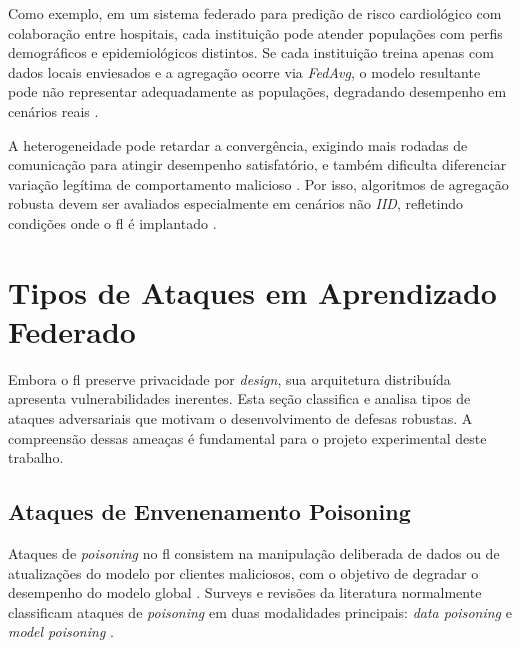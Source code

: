 Como exemplo, em um sistema federado para predição de risco cardiológico com colaboração entre hospitais, cada instituição pode atender populações com perfis demográficos e epidemiológicos distintos. Se cada instituição treina apenas com dados locais enviesados e a agregação ocorre via \textit{FedAvg}, o modelo resultante pode não representar adequadamente as populações, degradando desempenho em cenários reais \cite{Zhao2018,Bhagoji2019}.

A heterogeneidade pode retardar a convergência, exigindo mais rodadas de comunicação para atingir desempenho satisfatório, e também dificulta diferenciar variação legítima de comportamento malicioso \cite{Lyu2020}. Por isso, algoritmos de agregação robusta devem ser avaliados especialmente em cenários não \textit{IID}, refletindo condições onde o \gls{fl} é implantado \cite{Chen2023,Sikandar2023}.

\section{Tipos de Ataques em Aprendizado Federado}
\label{sec:tipos-ataques}

Embora o \gls{fl} preserve privacidade por \textit{design}, sua arquitetura distribuída apresenta vulnerabilidades inerentes. Esta seção classifica e analisa tipos de ataques adversariais que motivam o desenvolvimento de defesas robustas. A compreensão dessas ameaças é fundamental para o projeto experimental deste trabalho.

\subsection{Ataques de Envenenamento Poisoning}
\label{subsec:ataques-envenenamento}

Ataques de \textit{poisoning} no \gls{fl} consistem na manipulação deliberada de dados ou de atualizações do modelo por clientes maliciosos, com o objetivo de degradar o desempenho do modelo global \cite{Tolpegin2020}. Surveys e revisões da literatura normalmente classificam ataques de \textit{poisoning} em duas modalidades principais: \textit{data poisoning} e \textit{model poisoning} \cite{Sagar2023,Liang2023}.

